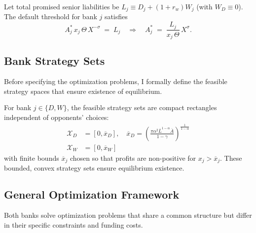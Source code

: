 \documentclass[12pt]{article}
\begin{document}
\begin{definition}\label{def:thresholds}
Let total promised senior liabilities be $L_j\equiv D_j+(1+r_w)W_j$ (with $W_D\equiv 0$). The default threshold for bank $j$ satisfies
\begin{equation}
A_j^*\,x_j\,\Theta\,X^{-\sigma}\;=\; L_j\quad \Rightarrow\quad A_j^*\;=\; \frac{L_j}{x_j\,\Theta}\,X^{\sigma}.\label{eq:threshold}
\end{equation}
\end{definition}

\subsection{Bank Strategy Sets}
Before specifying the optimization problems, I formally define the feasible strategy spaces that ensure existence of equilibrium.

\begin{definition}\label{def:strategy-sets}
For bank $j \in \{D,W\}$, the feasible strategy sets are compact rectangles independent of opponents' choices:
\begin{align}
\mathcal{X}_D &= [0, \overline{x}_D],\quad \overline{x}_D = \left(\frac{\pi\alpha^2\overline{L}^{1-\alpha}\overline{A}}{1-\gamma}\right)^{\frac{1}{1-\alpha}} \label{eq:strategy-set-D}\\
\mathcal{X}_W &= [0, \overline{x}_W] \label{eq:strategy-set-W}
\end{align}
with finite bounds $\overline{x}_j$ chosen so that profits are non-positive for $x_j>\overline{x}_j$. These bounded, convex strategy sets ensure equilibrium existence.
\end{definition}

\subsection{General Optimization Framework}
Both banks solve optimization problems that share a common structure but differ in their specific constraints and funding costs.
\end{document}
